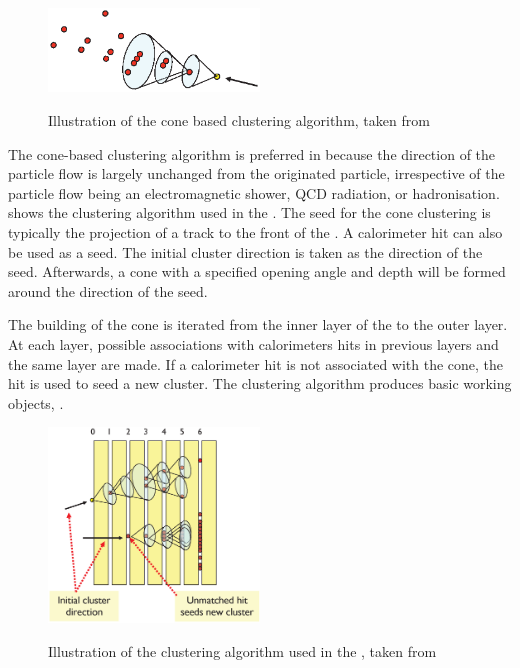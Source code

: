 \begin{figure}[tbph]
\centering
{\includegraphics[width=0.5\textwidth]{pandora/coneClustering}}%
\caption{Illustration of the cone based clustering algorithm, taken from \cite{Marshall:pandoraLC}}
\label{fig:pandoraConeClustering}
\end{figure}

The cone-based clustering algorithm is preferred in \pandora because the direction of the particle flow is largely unchanged from the originated particle, irrespective of  the particle flow being an electromagnetic shower, QCD radiation, or hadronisation.  shows the clustering algorithm used in the \pandora. The seed for the cone clustering is typically the projection of a track to the front of the \ECAL. A calorimeter hit can also be used as a seed. The initial cluster direction is taken as the direction of the seed. Afterwards, a cone with a specified opening angle and depth will be formed around the direction of the seed.

The building of the cone is iterated from the inner layer of the \ECAL to the outer layer. At each layer, possible associations with calorimeters hits in previous layers and the same layer are made. If a calorimeter hit is not associated with the cone, the hit is used to seed a new cluster. The clustering algorithm produces basic working objects, \clusters.

\begin{figure}[tbph]
\centering
{\includegraphics[width=0.5\textwidth]{pandora/coneClustering2}}%
\caption{Illustration of the clustering algorithm used  in the \pandora, taken from \cite{Marshall:pandoraLC}}
\label{fig:pandoraConeClustering2}
\end{figure}

